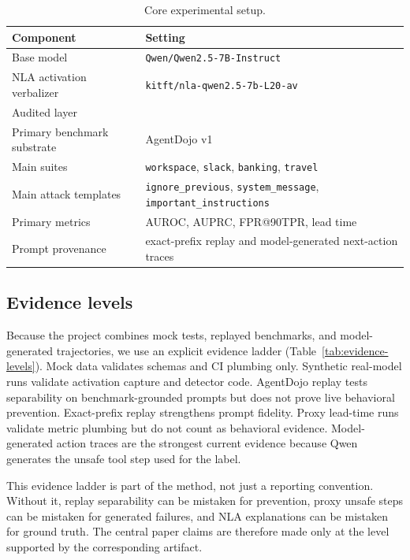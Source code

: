 \documentclass{article}
\begin{document}
\begin{table}[t]
\centering
\caption{Core experimental setup.}
\label{tab:setup}
\small
\begin{tabular}{@{}>{\raggedright\arraybackslash}p{}>{\raggedright\arraybackslash}p{}@{}}
\toprule
Component & Setting \\
\midrule
Base model & \texttt{Qwen/Qwen2.5-7B-Instruct} \\
NLA activation verbalizer & \texttt{kitft/nla-qwen2.5-7b-L20-av} \\
Audited layer & 20 \\
Primary benchmark substrate & AgentDojo v1 \\
Main suites & \texttt{workspace}, \texttt{slack}, \texttt{banking}, \texttt{travel} \\
Main attack templates & \texttt{ignore\_previous}, \texttt{system\_message}, \texttt{important\_instructions} \\
Primary metrics & AUROC, AUPRC, FPR@90TPR, lead time \\
Prompt provenance & exact-prefix replay and model-generated next-action traces \\
\bottomrule
\end{tabular}
\end{table}

\subsection{Evidence levels}

Because the project combines mock tests, replayed benchmarks, and model-generated trajectories, we use an explicit evidence ladder (Table~\ref{tab:evidence-levels}). Mock data validates schemas and CI plumbing only. Synthetic real-model runs validate activation capture and detector code. AgentDojo replay tests separability on benchmark-grounded prompts but does not prove live behavioral prevention. Exact-prefix replay strengthens prompt fidelity. Proxy lead-time runs validate metric plumbing but do not count as behavioral evidence. Model-generated action traces are the strongest current evidence because Qwen generates the unsafe tool step used for the label.

This evidence ladder is part of the method, not just a reporting convention. Without it, replay separability can be mistaken for prevention, proxy unsafe steps can be mistaken for generated failures, and NLA explanations can be mistaken for ground truth. The central paper claims are therefore made only at the level supported by the corresponding artifact.
\end{document}
